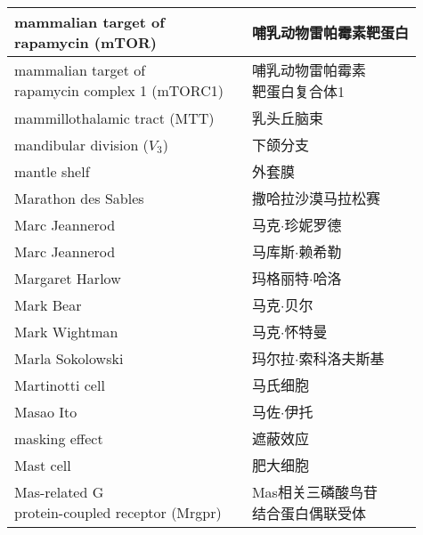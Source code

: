 \begin{longtable}{lll}
	\midrule
	\makecell[l]{mammalian target of \\rapamycin (mTOR)}   && 哺乳动物雷帕霉素靶蛋白  \\
	
	\midrule
	\makecell[l]{mammalian target of \\rapamycin complex 1 (mTORC1)}   && \makecell[l]{哺乳动物雷帕霉素\\靶蛋白复合体1}  \\
	
	\midrule
	mammillothalamic tract (MTT)  && 乳头丘脑束  \\
	
	\midrule
	mandibular division ($V_3$)   && 下颌分支  \\
	
	\midrule
	mantle shelf   && 外套膜  \\
	
	\midrule
	Marathon des Sables   && 撒哈拉沙漠马拉松赛  \\
	
	\midrule
	Marc Jeannerod   && 马克$\cdot$珍妮罗德  \\
	
	\midrule
	Marc Jeannerod   && 马库斯$\cdot$赖希勒  \\
	
	\midrule
	Margaret Harlow   && 玛格丽特$\cdot$哈洛  \\
	
	\midrule
	Mark Bear   && 马克$\cdot$贝尔  \\
	
	\midrule
	Mark Wightman   && 马克$\cdot$怀特曼  \\
	
	\midrule
	Marla Sokolowski   && 玛尔拉$\cdot$索科洛夫斯基 \\
	
	\midrule
	Martinotti cell   && 马氏细胞 \\
	
	\midrule
	Masao Ito   && 马佐$\cdot$伊托 \\
	
	\midrule
	masking effect   && 遮蔽效应 \\
	
	\midrule
	Mast cell   && 肥大细胞 \\
	
	\midrule
	\makecell[l]{Mas-related G \\protein-coupled receptor (Mrgpr)}  && \makecell[l]{Mas相关三磷酸鸟苷\\结合蛋白偶联受体} \\
	

\end{longtable}
